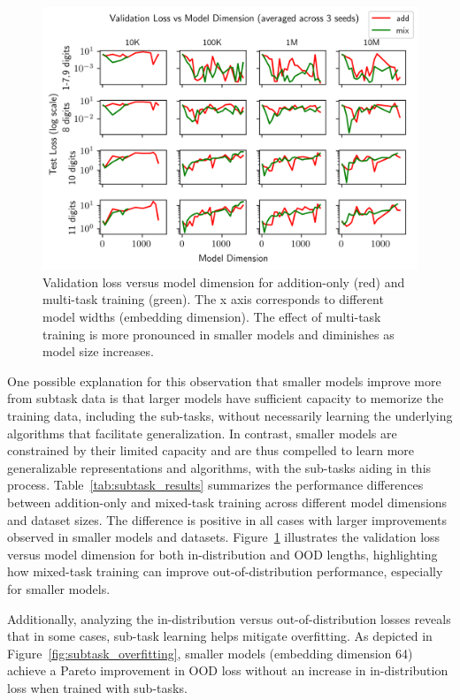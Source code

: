 \begin{figure}[!h]
    \centering
    \includegraphics[width=\textwidth]{fig/exp_27_val_loss_vs_n_embd.png}
    \caption{Validation loss versus model dimension for addition-only (red) and multi-task training (green). The x axis corresponds to different model widths (embedding dimension). The effect of multi-task training is more pronounced in smaller models and diminishes as model size increases.}
    \label{fig:exp_27_val_loss_vs_n_embd}
\end{figure}

One possible explanation for this observation that smaller models improve more from subtask data is that larger models have sufficient capacity to memorize the training data, including the sub-tasks, without necessarily learning the underlying algorithms that facilitate generalization. In contrast, smaller models are constrained by their limited capacity and are thus compelled to learn more generalizable representations and algorithms, with the sub-tasks aiding in this process. Table~\ref{tab:subtask_results} summarizes the performance differences between addition-only and mixed-task training across different model dimensions and dataset sizes. The difference is positive in all cases with larger improvements observed in smaller models and datasets. Figure~\ref{fig:exp_27_val_loss_vs_n_embd} illustrates the validation loss versus model dimension for both in-distribution and OOD lengths, highlighting how mixed-task training can improve out-of-distribution performance, especially for smaller models.

Additionally, analyzing the in-distribution versus out-of-distribution losses reveals that in some cases, sub-task learning helps mitigate overfitting. As depicted in Figure~\ref{fig:subtask_overfitting}, smaller models (embedding dimension 64) achieve a Pareto improvement in OOD loss without an increase in in-distribution loss when trained with sub-tasks.

